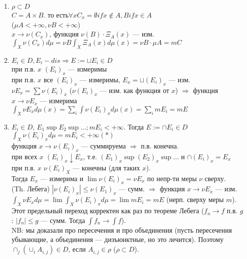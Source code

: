\documentclass[paper=a4, fontsize=13.2pt]{article}
\begin{document}
		\begin{enumerate}
			\item
				$\rho \subset D$\\
				$C = A \times B$. то есть$\forall x C_x = {\emptyset if x \not\in A, B if x \in A}$\\
				($\mu A  < +\infty, \nu B < +\infty$)\\
				$x \rightarrow \nu(C_x)$, функция $\nu(B) \cdot \Xi_A(x)$ --- изм.\\
				$\int_X \nu(C_x)d\mu = \nu B \int_X \Xi_A(x)d\mu(x) = \nu B \cdot \mu A = m C$
			\item
				$E_i \in D, E_i - dis \Rightarrow E := \sqcup E_i \in D$\\
				при п.в. $x$ $(E_i)_x$ --- измеримы\\
				при п.в. $x$ все $(E_i)_x$ --- измеримы, $E_x = \sqcup (E_i)_x$ --- изм.\\
				$\nu E_x = \sum \nu (E_i)_x$ ($\nu (E_i)_x$ --- изм. как функция от $x$) $\Rightarrow$ функция $ x \rightarrow \nu E_x$ --- измерима\\
				$\int_X \nu E_x d\mu(x) = \sum_{i}\int\nu(E_i)_x d\mu(x) = \sum_{i}m E_i = m E$
			\item
				$E_i \in D$, $E_1 \sup E_2 \sup \ldots ; m E_i < +\infty$. Тогда $E := \cap E_i \in D$\\
				$\int_X\nu(E_i)_x d\mu = m E_i < +\infty(*)$\\
				функция $x \rightarrow \nu(E_i)_x$ --- суммируема $\Rightarrow$ п.в. конечна.\\
				при всех $x$ $(E_i)_x \downarrow E_x$, т.е. $(E_1)_x \sup (E_2)_x \sup \ldots $ и $\cap(E_i)_x = E_x$\\
				при п.в. $x$ $\nu(E_i)_X$ --- конечны (для таких $x$).\\
				Тогда $E_x$ --- измерима и $\lim \nu(E_i)_x = \nu E_x$ по непр-ти меры $\nu$ сверху.\\
				(Th. Лебега) $|\nu(E_i)_x| \leq \nu(E_1)_x$ --- сумм. $\Rightarrow$ функция $x \rightarrow \nu E_x$ --- изм.\\
				$\int_X\nu E_x d\mu = \lim\int_X\nu(E_i)_x d\mu = \lim m E_i = m E$ (нерп. сверху меры $m$). Этот предельный переход корректен как раз по теореме Лебега ($f_n \rightarrow f$ п.в. $g$ : $|f_n| \leq g$ --- сумм. Тогда $\int f_n \rightarrow \int f$).\\
				NB: мы доказали про пересечения и про объединения (пусть пересечения убывающие, а объединения --- дизъюнктные, но это лечится). Поэтому $\cap_j(\cup_i A_{i, j}) \in D$, если $A_{i,j} \in \rho$ ($\rho \subset D$).

\end{enumerate}
\end{document}
